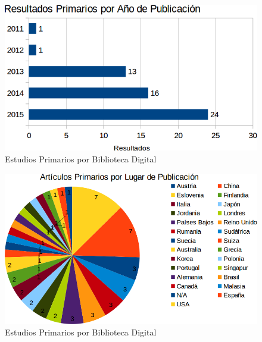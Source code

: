 \documentclass{report}
\begin{document}
            \begin{figure}[H]
        		\begin{center}
        			\includegraphics[scale=0.45]{images/1document/PrimariosAnio.png}
        			\caption{Estudios Primarios por Biblioteca Digital}
		        	\label{primariosBiblioteca}
           		\end{center}
        	\end{figure}
        	
            \begin{figure}[H]
        		\begin{center}
        			\includegraphics[scale=0.45]{images/1document/PrimariosLugar.png}
        			\caption{Estudios Primarios por Biblioteca Digital}
		        	\label{primariosBiblioteca}
           		\end{center}
        	\end{figure}
    	    
\end{document}
